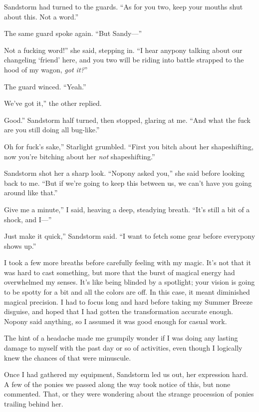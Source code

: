 Sandstorm had turned to the guards. “As for you two, keep your mouths shut about this. Not a word.”

The same guard spoke again. “But Sandy—”

\leavevmode{}Not a fucking word!” she said, stepping in. “I hear anypony talking about our changeling ‘friend’ here, and you two will be riding into battle strapped to the hood of my wagon, \textit{got it?}”

The guard winced. “Yeah.”

\leavevmode{}We’ve got it,” the other replied.

\leavevmode{}Good.” Sandstorm half turned, then stopped, glaring at me. “And what the fuck are you still doing all bug-like.”

\leavevmode{}Oh for fuck’s sake,” Starlight grumbled. “First you bitch about her shapeshifting, now you’re bitching about her \textit{not} shapeshifting.”

Sandstorm shot her a sharp look. “Nopony asked you,” she said before looking back to me. “But if we’re going to keep this between us, we can’t have you going around like that.”

\leavevmode{}Give me a minute,” I said, heaving a deep, steadying breath. “It’s still a bit of a shock, and I—”

\leavevmode{}Just make it quick,” Sandstorm said. “I want to fetch some gear before everypony shows up.”

I took a few more breaths before carefully feeling with my magic. It’s not that it was hard to cast something, but more that the burst of magical energy had overwhelmed my senses. It’s like being blinded by a spotlight; your vision is going to be spotty for a bit and all the colors are off. In this case, it meant diminished magical precision. I had to focus long and hard before taking my Summer Breeze disguise, and hoped that I had gotten the transformation accurate enough. Nopony said anything, so I assumed it was good enough for casual work.

The hint of a headache made me grumpily wonder if I was doing any lasting damage to myself with the past day or so of activities, even though I logically knew the chances of that were minuscule.

Once I had gathered my equipment, Sandstorm led us out, her expression hard. A few of the ponies we passed along the way took notice of this, but none commented. That, or they were wondering about the strange procession of ponies trailing behind her.

